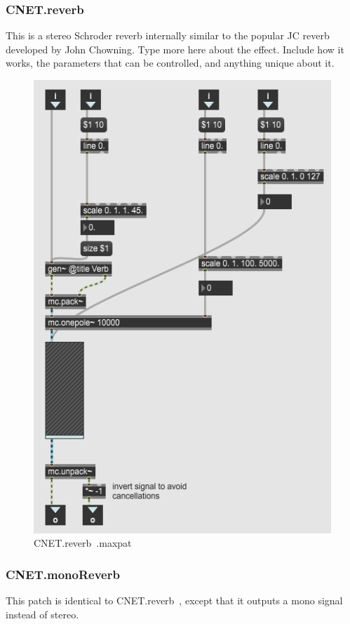 \subsubsection{CNET.reverb~}
This is a stereo Schroder reverb internally similar to the popular JC reverb developed by John Chowning. Type more here about the effect. Include how it works, the parameters that can be controlled, and anything unique about it. 

\begin{figure}
    \centering
    \includegraphics{diagrams/maxPatches/CNET.reverb~.png}
    \caption{CNET.reverb~.maxpat}
    \label{fig:my_label}
\end{figure}

\subsubsection{CNET.monoReverb~}
This patch is identical to CNET.reverb~, except that it outputs a mono signal instead of stereo.

